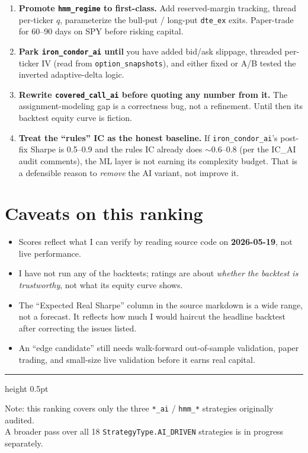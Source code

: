 \documentclass[11pt,a4paper]{article}
\begin{document}
\begin{enumerate}[leftmargin=*,itemsep=3pt]
  \item \textbf{Promote \texttt{hmm\_regime} to first-class.} Add reserved-margin tracking, thread per-ticker $q$, parameterize the bull-put / long-put \texttt{dte\_ex} exits. Paper-trade for 60--90 days on SPY before risking capital.
  \item \textbf{Park \texttt{iron\_condor\_ai} until} you have added bid/ask slippage, threaded per-ticker IV (read from \texttt{option\_snapshots}), and either fixed or A/B tested the inverted adaptive-delta logic.
  \item \textbf{Rewrite \texttt{covered\_call\_ai} before quoting any number from it.} The assignment-modeling gap is a correctness bug, not a refinement. Until then its backtest equity curve is fiction.
  \item \textbf{Treat the ``rules'' IC as the honest baseline.} If \texttt{iron\_condor\_ai}'s post-fix Sharpe is 0.5--0.9 and the rules IC already does $\sim$0.6--0.8 (per the IC\_AI audit comments), the ML layer is not earning its complexity budget. That is a defensible reason to \emph{remove} the AI variant, not improve it.
\end{enumerate}

\section*{Caveats on this ranking}

\begin{itemize}[leftmargin=*,itemsep=2pt]
  \item Scores reflect what I can verify by reading source code on \textbf{2026-05-19}, not live performance.
  \item I have not run any of the backtests; ratings are about \emph{whether the backtest is trustworthy}, not what its equity curve shows.
  \item The ``Expected Real Sharpe'' column in the source markdown is a wide range, not a forecast. It reflects how much I would haircut the headline backtest after correcting the issues listed.
  \item An ``edge candidate'' still needs walk-forward out-of-sample validation, paper trading, and small-size live validation before it earns real capital.
\end{itemize}

\vspace{12pt}
\hrule height 0.5pt
\vspace{6pt}
\begin{center}
\footnotesize\color{gray}
Note: this ranking covers only the three \texttt{*\_ai} / \texttt{hmm\_*} strategies originally audited.\\
A broader pass over all 18 \texttt{StrategyType.AI\_DRIVEN} strategies is in progress separately.
\end{center}
\end{document}

